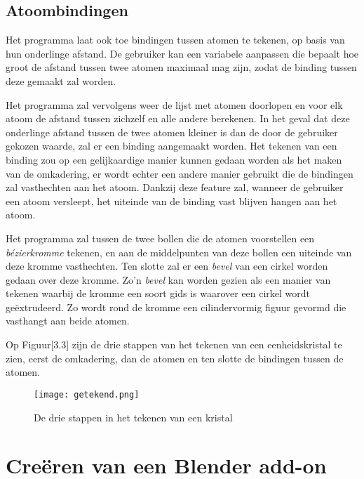 \subsection{Atoombindingen}
Het programma laat ook toe bindingen tussen atomen te tekenen, op basis van hun onderlinge afstand. De gebruiker kan een variabele aanpassen die bepaalt hoe groot de afstand tussen twee atomen maximaal mag zijn, zodat de binding tussen deze gemaakt zal worden.
\par
Het programma zal vervolgens weer de lijst met atomen doorlopen en voor elk atoom de afstand tussen zichzelf en alle andere berekenen. In het geval dat deze onderlinge afstand tussen de twee atomen kleiner is dan de door de gebruiker gekozen waarde, zal er een binding aangemaakt worden. Het tekenen van een binding zou op een gelijkaardige manier kunnen gedaan worden als het maken van de omkadering, er wordt echter een andere manier gebruikt die de bindingen zal vasthechten aan het atoom. Dankzij deze feature zal, wanneer de gebruiker een atoom versleept, het uiteinde van de binding vast blijven hangen aan het atoom.
\par
Het programma zal tussen de twee bollen die de atomen voorstellen een \textit{bézierkromme} tekenen, en aan de middelpunten van deze bollen een uiteinde van deze kromme vasthechten. Ten slotte zal er een \textit{bevel} van een cirkel worden gedaan over deze kromme. Zo'n \textit{bevel} kan worden gezien als een manier van tekenen waarbij de kromme een soort gids is waarover een cirkel wordt geëxtrudeerd. Zo wordt rond de kromme een cilindervormig figuur gevormd die vasthangt aan beide atomen. 
\par
Op Figuur[3.3] zijn de drie stappen van het tekenen van een eenheidskristal te zien, eerst de omkadering, dan de atomen en ten slotte de bindingen tussen de atomen.
\begin{figure}[h]
\begin{center}
\texttt{[image: getekend.png]}
\end{center}
\caption{De drie stappen in het tekenen van een kristal}
\end{figure}

\section{Creëren van een Blender add-on}

